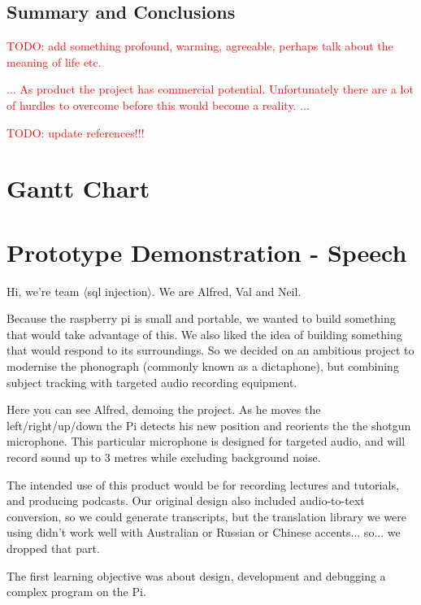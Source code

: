 \documentclass[11pt,a4paper,titlepage]{report}
\begin{document}
\section{Summary and Conclusions}

\textcolor{red}{TODO: add something profound, warming, agreeable, perhaps talk about the meaning of life etc.}

\textcolor{red}{... As product the project has commercial potential. Unfortunately there are a lot of hurdles to overcome before this would become a reality. ...}


\textcolor{red}{TODO: update references!!!}


\begin{appendices}

\chapter{Gantt Chart}



\chapter{Prototype Demonstration - Speech}

\newpage

Hi, we're team $\langle$sql injection$\rangle$. We are Alfred, Val and Neil.

Because the raspberry pi is small and portable, we wanted to build something that would take advantage of this. We also liked the idea of building something that would respond to its surroundings. So we decided on an ambitious project to modernise the phonograph (commonly known as a dictaphone), but combining subject tracking with targeted audio recording equipment.

Here you can see Alfred, demoing the project. As he moves the left/right/up/down the Pi detects his new position and reorients the the shotgun microphone. This particular microphone is designed for targeted audio, and will record sound up to 3 metres while excluding background noise. 

The intended use of this product would be for recording lectures and tutorials, and producing podcasts. Our original design also included audio-to-text conversion, so we could generate transcripts, but the translation library we were using didn’t work well with Australian or Russian or Chinese accents... so... we dropped that part.

The first learning objective was about design, development and debugging a complex program on the Pi. 


\end{appendices}
\end{document}
